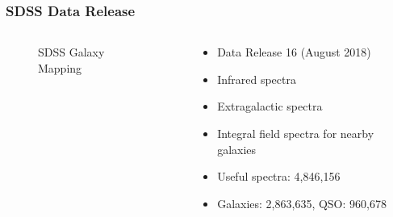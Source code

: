 \documentclass{beamer}
\begin{document}
\begin{frame}
 	\frametitle{SDSS Data Release}
    \begin{columns}[onlytextwidth]
    \begin{column}{.45\textwidth}
        \begin{figure}
            \caption*{SDSS Galaxy Mapping}
        \end{figure}
   \end{column}
    \hfill
    \begin{column}{.45\textwidth}
    \begin{itemize}
        \item Data Release 16 (August 2018)
        \item Infrared spectra
        \item Extragalactic spectra
        \item Integral field spectra for nearby galaxies
        \item Useful spectra: 4,846,156
        \item Galaxies: 2,863,635, QSO: 960,678
    \end{itemize}
    \end{column}
    \end{columns}
    \end{frame}
\end{document}
